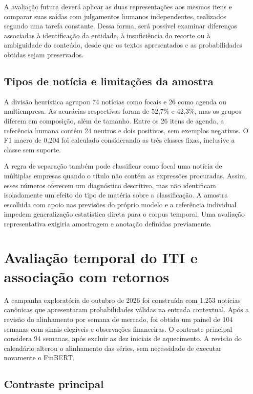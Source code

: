 A avaliação futura deverá aplicar as duas representações aos mesmos itens e comparar suas saídas com julgamentos humanos independentes, realizados segundo uma tarefa constante. Dessa forma, será possível examinar diferenças associadas à identificação da entidade, à insuficiência do recorte ou à ambiguidade do conteúdo, desde que os textos apresentados e as probabilidades obtidas sejam preservados.

\subsection{Tipos de notícia e limitações da amostra}

A divisão heurística agrupou 74 notícias como focais e 26 como agenda ou multiempresa. As acurácias respectivas foram de 52,7\% e 42,3\%, mas os grupos diferem em composição, além de tamanho. Entre os 26 itens de agenda, a referência humana contém 24 neutros e dois positivos, sem exemplos negativos. O F1 macro de 0,204 foi calculado considerando as três classes fixas, inclusive a classe sem suporte.

A regra de separação também pode classificar como focal uma notícia de múltiplas empresas quando o título não contém as expressões procuradas. Assim, esses números oferecem um diagnóstico descritivo, mas não identificam isoladamente um efeito do tipo de matéria sobre a classificação. A amostra escolhida com apoio nas previsões do próprio modelo e a referência individual impedem generalização estatística direta para o corpus temporal. Uma avaliação representativa exigiria amostragem e anotação definidas previamente.

\section{Avaliação temporal do ITI e associação com retornos}

A campanha exploratória de outubro de 2026 foi construída com 1.253 notícias canônicas que apresentaram probabilidades válidas na entrada contextual. Após a revisão do alinhamento por semana de mercado, foi obtido um painel de 104 semanas com sinais elegíveis e observações financeiras. O contraste principal considera 94 semanas, após excluir as dez iniciais de aquecimento. A revisão do calendário alterou o alinhamento das séries, sem necessidade de executar novamente o FinBERT.

\subsection{Contraste principal}
\label{subsec:campanha-iti}

